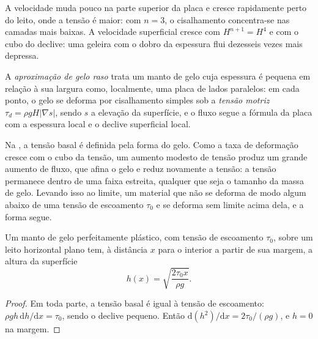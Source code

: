 A velocidade muda pouco na parte superior da placa e cresce rapidamente perto do
leito, onde a tensão é maior: com $n = 3$, o cisalhamento concentra-se nas
camadas mais baixas. A velocidade superficial cresce com $H^{n+1} = H^4$ e com o
cubo do declive: uma geleira com o dobro da espessura flui dezesseis vezes mais depressa.

\begin{definition}\label{def:b3:glaciology:sia}
A \emph{aproximação de gelo raso} trata
um manto de gelo cuja espessura é pequena em relação à sua largura como, localmente, uma
placa de lados paralelos: em cada ponto, o gelo se deforma por cisalhamento simples sob
a \emph{tensão motriz} $\tau_d = \rho gH|\nabla s|$, sendo $s$ a elevação da
superfície, e o fluxo segue a fórmula da placa com a espessura local e o
declive superficial local.
\end{definition}

Na , a tensão basal é definida pela forma do
gelo. Como a taxa de deformação cresce com o cubo da tensão, um aumento modesto de
tensão produz um grande aumento de fluxo, que afina o gelo
e reduz novamente a tensão: a tensão permanece dentro de uma faixa estreita,
qualquer que seja o tamanho da massa de gelo. Levando isso ao limite, um material que
não se deforma de modo algum abaixo de uma tensão de escoamento $\tau_0$ e se deforma sem
limite acima dela, e a forma segue.

\begin{proposition}\label{prop:b3:glaciology:nye}
Um manto de gelo perfeitamente plástico, com tensão de escoamento $\tau_0$, sobre um
leito horizontal plano tem, à distância $x$ para o interior a partir de sua margem, a altura da superfície
\[
h(x) = \sqrt{\frac{2\tau_0x}{\rho g}} .
\]
\end{proposition}

\begin{proof}
Em toda parte, a tensão basal é igual à tensão de escoamento: $\rho gh\,\mathrm
dh/\mathrm dx = \tau_0$, sendo o declive pequeno. Então $\mathrm d(h^2)/\mathrm
dx = 2\tau_0/(\rho g)$, e $h = 0$ na margem.
\end{proof}

